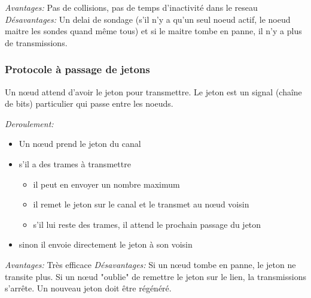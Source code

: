 \documentclass[a4paper, 12pt, french]{article}
\begin{document}
	\emph{Avantages:} Pas de collisions, pas de temps d'inactivité dans le reseau
	\emph{Désavantages:} Un delai de sondage (s'il n'y a qu'un seul noeud actif, le noeud maitre les sondes quand même tous) et si le maitre tombe en panne, il n'y a plus de transmissions.

	\subsubsection{Protocole à passage de jetons}

	Un nœud attend d'avoir le jeton pour transmettre. Le jeton est un signal (chaîne de bits) particulier qui passe entre les noeuds.

	\emph{Deroulement:}
	\begin{itemize}
		\item Un nœud prend le jeton du canal
		\item s'il a des trames à transmettre
		\begin{itemize}
			\item il peut en envoyer un nombre maximum
			\item il remet le jeton sur le canal et le transmet au nœud voisin
			\item s'il lui reste des trames, il attend le prochain passage du jeton
		\end{itemize}
		\item sinon il envoie directement le jeton à son voisin
	\end{itemize}

	\emph{Avantages:} Très efficace
	\emph{Désavantages:} Si un nœud tombe en panne, le jeton ne transite plus. Si un nœud "oublie" de remettre le jeton sur le lien, la transmissions s'arrête. Un nouveau jeton doit être régénéré.
\end{document}
